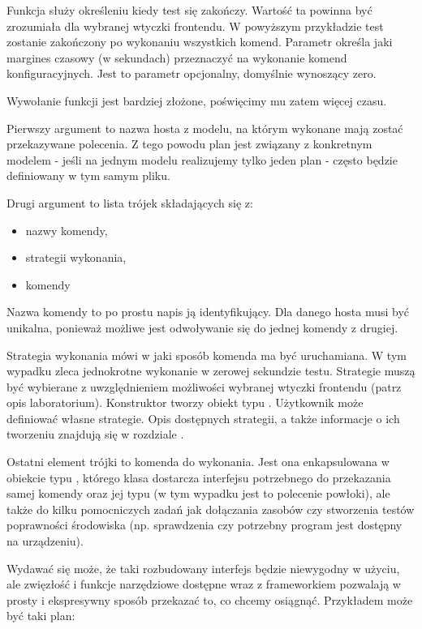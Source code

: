 \documentclass[00-praca-magisterska.tex]{subfiles}
\begin{document}
Funkcja  służy określeniu kiedy test się zakończy.
Wartość ta powinna być zrozumiała dla wybranej wtyczki frontendu. W powyższym
przykładzie test zostanie zakończony po wykonaniu wszystkich komend. Parametr
 określa jaki margines czasowy (w sekundach)
przeznaczyć na wykonanie komend konfiguracyjnych. Jest to parametr opcjonalny,
domyślnie wynoszący zero.

Wywołanie funkcji  jest bardziej złożone, poświęcimy mu
zatem więcej czasu.

Pierwszy argument to nazwa hosta z modelu, na którym wykonane mają zostać
przekazywane polecenia. Z tego powodu plan jest związany z konkretnym modelem -
jeśli na jednym modelu realizujemy tylko jeden plan - często będzie definiowany
w tym samym pliku.

Drugi argument to lista trójek składających się z:
\begin{itemize}
\item nazwy komendy,
\item strategii wykonania,
\item komendy
\end{itemize}

Nazwa komendy to po prostu napis ją identyfikujący. Dla danego hosta musi być
unikalna, ponieważ możliwe jest odwoływanie się do jednej komendy z drugiej.

Strategia wykonania mówi w jaki sposób komenda ma być uruchamiana. W tym
wypadku  zleca jednokrotne wykonanie w zerowej sekundzie testu.
Strategie muszą być wybierane z uwzględnieniem możliwości wybranej wtyczki
frontendu (patrz opis laboratorium). Konstruktor  tworzy obiekt typu
. Użytkownik może definiować własne strategie. Opis dostępnych
strategii, a także informacje o ich tworzeniu znajdują się w rozdziale
.

Ostatni element trójki to komenda do wykonania. Jest ona enkapsulowana w
obiekcie typu , którego klasa dostarcza interfejsu
potrzebnego do przekazania samej komendy oraz jej typu (w tym wypadku jest to
polecenie powłoki), ale także do kilku pomocniczych zadań jak dołączania
zasobów czy stworzenia testów poprawności środowiska (np. sprawdzenia czy
potrzebny program jest dostępny na urządzeniu).

Wydawać się może, że taki rozbudowany interfejs będzie niewygodny w użyciu, ale
zwięzłość i funkcje narzędziowe dostępne wraz z frameworkiem pozwalają w prosty
i ekspresywny sposób przekazać to, co chcemy osiągnąć. Przykładem może być taki
plan:
\end{document}
